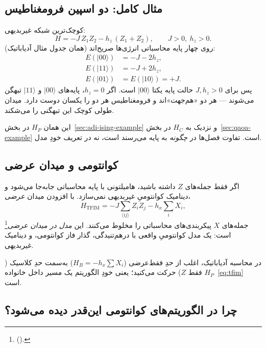 \subsection{مثال کامل: دو اسپین فرومغناطیس}

کوچک‌ترین شبکه غیربدیهی:
\begin{equation}
	\label{eq:ising-two}
	H = -J\, Z_1 Z_2 - h_z\,(Z_1+Z_2),
	\qquad
	J>0,\ h_z>0.
\end{equation}
روی چهار پایه محاسباتی انرژی‌ها صریح‌اند (همان جدول مثال آدیاباتیک):
\begin{equation}
	\begin{aligned}
		E(\lvert00\rangle) &= -J-2h_z,\\
		E(\lvert11\rangle) &= -J+2h_z,\\
		E(\lvert01\rangle) &= E(\lvert10\rangle) = +J.
	\end{aligned}
\end{equation}
پس برای $J,h_z>0$ حالت پایه یکتا $\lvert00\rangle$ است. اگر $h_z=0$، پایه‌های $\lvert00\rangle$ و $\lvert11\rangle$ تبهگن می‌شوند --- هر دو «هم‌جهت»اند و فرومغناطیس هر دو را یکسان دوست دارد. میدان طولی کوچک این تبهگنی را می‌شکند.

این همان $H_P$ در بخش~\ref{sec:adi-ising-example} و نزدیک به $H_C$ در بخش~\ref{sec:qaoa-example} است. تفاوت فصل‌ها در \emph{چگونه} به پایه می‌رسند است، نه در تعریف خودِ مدل.

\subsection{ کوانتومی و میدان عرضی}

اگر فقط جمله‌های $Z$ داشته باشید، هامیلتونی با پایه محاسباتی جابه‌جا می‌شود و دینامیک کوانتومیِ غیربدیهی نمی‌سازد. با افزودن میدان \emph{عرضی}،
\begin{equation}
	\label{eq:tfim}
	H_{\mathrm{TFIM}}
	=
	-J\sum_{\langle ij\rangle} Z_i Z_j
	-
	h_x\sum_i X_i,
\end{equation}
جمله‌های $X$ پیکربندی‌های محاسباتی را مخلوط می‌کنند. این \emph{مدل  در میدان عرضی}\footnote{ ().} است: یک مدل کوانتومیِ واقعی با درهم‌تنیدگی، گذار فاز کوانتومی، و دینامیک غیربدیهی.

در محاسبه آدیاباتیک، اغلب از حدِ فقط‌عرضی ($H_B=-h_x\sum X_i$) به‌سمت حدِ کلاسیک ($H_P$ فقط $Z$) حرکت می‌کنید؛ یعنی خودِ الگوریتم یک مسیر داخل خانواده~\eqref{eq:tfim} است.

\subsection{چرا در الگوریتم‌های کوانتومی این‌قدر دیده می‌شود؟}

